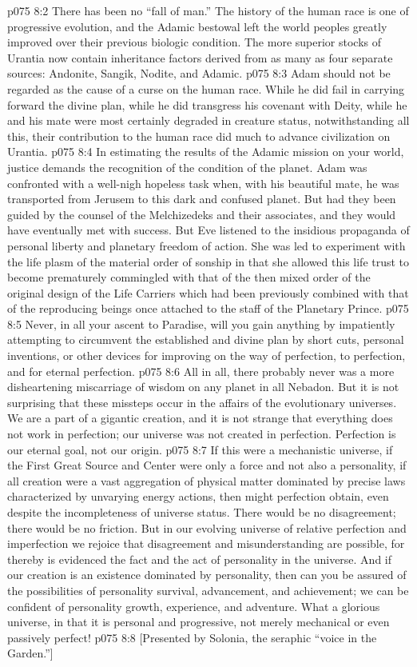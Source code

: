 \vs p075 8:2 There has been no “fall of man.” The history of the human race is one of progressive evolution, and the Adamic bestowal left the world peoples greatly improved over their previous biologic condition. The more superior stocks of Urantia now contain inheritance factors derived from as many as four separate sources: Andonite, Sangik, Nodite, and Adamic.
\vs p075 8:3 Adam should not be regarded as the cause of a curse on the human race. While he did fail in carrying forward the divine plan, while he did transgress his covenant with Deity, while he and his mate were most certainly degraded in creature status, notwithstanding all this, their contribution to the human race did much to advance civilization on Urantia.
\vs p075 8:4 \pc In estimating the results of the Adamic mission on your world, justice demands the recognition of the condition of the planet. Adam was confronted with a well\hyp{}nigh hopeless task when, with his beautiful mate, he was transported from Jerusem to this dark and confused planet. But had they been guided by the counsel of the Melchizedeks and their associates, and  they would have eventually met with success. But Eve listened to the insidious propaganda of personal liberty and planetary freedom of action. She was led to experiment with the life plasm of the material order of sonship in that she allowed this life trust to become prematurely commingled with that of the then mixed order of the original design of the Life Carriers which had been previously combined with that of the reproducing beings once attached to the staff of the Planetary Prince.
\vs p075 8:5 Never, in all your ascent to Paradise, will you gain anything by impatiently attempting to circumvent the established and divine plan by short cuts, personal inventions, or other devices for improving on the way of perfection, to perfection, and for eternal perfection.
\vs p075 8:6 \pc All in all, there probably never was a more disheartening miscarriage of wisdom on any planet in all Nebadon. But it is not surprising that these missteps occur in the affairs of the evolutionary universes. We are a part of a gigantic creation, and it is not strange that everything does not work in perfection; our universe was not created in perfection. Perfection is our eternal goal, not our origin.
\vs p075 8:7 If this were a mechanistic universe, if the First Great Source and Center were only a force and not also a personality, if all creation were a vast aggregation of physical matter dominated by precise laws characterized by unvarying energy actions, then might perfection obtain, even despite the incompleteness of universe status. There would be no disagreement; there would be no friction. But in our evolving universe of relative perfection and imperfection we rejoice that disagreement and misunderstanding are possible, for thereby is evidenced the fact and the act of personality in the universe. And if our creation is an existence dominated by personality, then can you be assured of the possibilities of personality survival, advancement, and achievement; we can be confident of personality growth, experience, and adventure. What a glorious universe, in that it is personal and progressive, not merely mechanical or even passively perfect!
\vsetoff
\vs p075 8:8 [Presented by Solonia, the seraphic “voice in the Garden.”]
